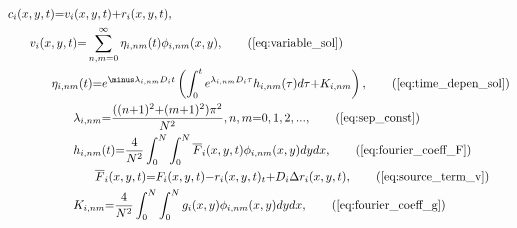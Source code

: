 \documentclass[\main/thesis.tex]{subfiles}
\begin{document}
\begin{align}
	                &c_i(x, y, t)            {=} v_{i}(x, y, t) {+} r_i(x, y, t),
	                 \label{eq:carcin_sol} \\
	&\hspace{0.25in} v_{i}(x, y, t)          {=} \sum_{n,m {=} 0}^{\infty}
	                                               \eta_{i,nm}(t) \phi_{i,nm}(x, y), 
	                 \tag{\ref{eq:variable_sol}} \\
	&\hspace{0.50in} \eta_{i,nm}(t)          {=} e^{\minus \lambda_{i,nm} D_i t}
	                                             \left(
	                                               \int_{0}^{t} 
	                                                 e^{\lambda_{i,nm} D_i \tau}
	                                                 h_{i,nm}(\tau)
	                                               d\tau
	                                               {+} K_{i,nm} 
	                                             \right),
	                 \tag{\ref{eq:time_depen_sol}} \\
	&\hspace{0.75in} \lambda_{i,nm}          {=} \frac{((n {+} 1)^2 {+} (m {+} 1)^2) \pi^2}
	                                                  {N^2},
	                 n, m {=} 0, 1, 2, ...,
	                 \tag{\ref{eq:sep_const}} \\
	&\hspace{0.75in} h_{i,nm}(t)             {=} \frac{4}
	                                                  {N^2}
	                                             \int_{0}^{N} \int_{0}^{N} 
	                                               \overline{F}_i(x, y, t) 
	                                               \phi_{i,nm}(x, y)
	                                             dydx,
	                 \tag{\ref{eq:fourier_coeff_F}} \\
	&\hspace{1.00in} \overline{F}_i(x, y, t) {=} F_i(x, y, t) {-} r_i(x, y, t)_t
	                                         {+} D_i \Delta r_i(x, y, t), 
	                 \tag{\ref{eq:source_term_v}} \\
	&\hspace{0.75in} K_{i,nm}                {=} \frac{4}
	                                                  {N^2}
	                                             \int_{0}^{N} \int_{0}^{N} 
	                                               g_i(x, y) \phi_{i,nm}(x, y)
	                                             dydx, 
	                 \tag{\ref{eq:fourier_coeff_g}} \\

\end{align}
\end{document}
